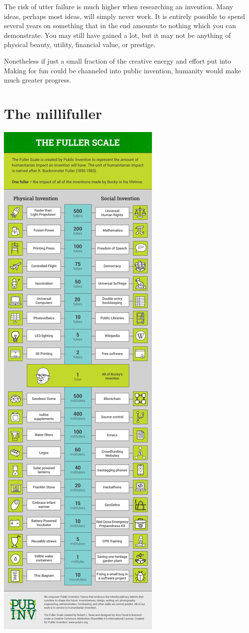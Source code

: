 \documentclass[
	fontsize=10pt, %
	twoside=false, %
	secnumdepth=1, %
]{kaobook}
\begin{document}
The risk of utter failure is much higher when researching
an invention.
Many ideas, perhaps most ideas, will simply never work.
It is entirely possible to spend several years on something
that in the end amounts to nothing which you can demonstrate.
You may still have gained a lot, but
it may not be anything of physical beauty, utility, financial value,
or prestige.

Nonetheless if just a small fraction of the creative energy
and effort put into Making for fun could be channeled into
public invention, humanity would make much greater progress.

\chapter{The millifuller}

\begin{marginfigure}
  \includegraphics{figures/FullerScale.png}

\end{marginfigure}
\end{document}
